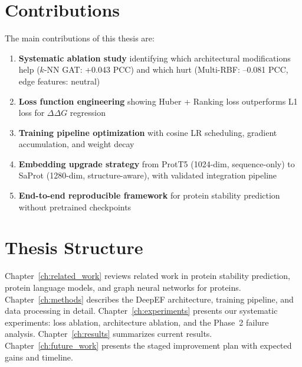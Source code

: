 \section{Contributions}

The main contributions of this thesis are:
\begin{enumerate}
    \item \textbf{Systematic ablation study} identifying which architectural modifications help ($k$-NN GAT: +0.043 PCC) and which hurt (Multi-RBF: --0.081 PCC, edge features: neutral)
    \item \textbf{Loss function engineering} showing Huber + Ranking loss outperforms L1 loss for $\Delta\Delta G$ regression
    \item \textbf{Training pipeline optimization} with cosine LR scheduling, gradient accumulation, and weight decay
    \item \textbf{Embedding upgrade strategy} from ProtT5 (1024-dim, sequence-only) to SaProt (1280-dim, structure-aware), with validated integration pipeline
    \item \textbf{End-to-end reproducible framework} for protein stability prediction without pretrained checkpoints
\end{enumerate}

\section{Thesis Structure}

Chapter~\ref{ch:related_work} reviews related work in protein stability prediction, protein language models, and graph neural networks for proteins. Chapter~\ref{ch:methods} describes the DeepEF architecture, training pipeline, and data processing in detail. Chapter~\ref{ch:experiments} presents our systematic experiments: loss ablation, architecture ablation, and the Phase~2 failure analysis. Chapter~\ref{ch:results} summarizes current results. Chapter~\ref{ch:future_work} presents the staged improvement plan with expected gains and timeline.
